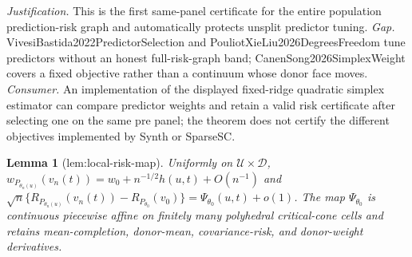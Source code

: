 \documentclass{article}
\newtheorem{lemma}{Lemma}
\begin{document}
\par\smallskip\noindent \textit{Justification.} This is the first same-panel certificate for the entire population prediction-risk graph and automatically protects unsplit predictor tuning. \textit{Gap.} VivesiBastida2022PredictorSelection and PouliotXieLiu2026DegreesFreedom tune predictors without an honest full-risk-graph band; CanenSong2026SimplexWeight covers a fixed objective rather than a continuum whose donor face moves. \textit{Consumer.} An implementation of the displayed fixed-ridge quadratic simplex estimator can compare predictor weights and retain a valid risk certificate after selecting one on the same pre panel; the theorem does not certify the different objectives implemented by Synth or SparseSC.

\begin{lemma}[lem:local-risk-map]\label{lem:local-risk-map}
Uniformly on \(\mathcal U\times\mathcal D\), \(w_{P_{\theta_n(u)}}(v_n(t))=w_0+n^{-1/2}h(u,t)+O(n^{-1})\) and \(\sqrt n\{R_{P_{\theta_n(u)}}(v_n(t))-R_{P_{\theta_0}}(v_0)\}=\Psi_{\theta_0}(u,t)+o(1)\). The map \(\Psi_{\theta_0}\) is continuous piecewise affine on finitely many polyhedral critical-cone cells and retains mean-completion, donor-mean, covariance-risk, and donor-weight derivatives.
\end{lemma}
\end{document}
